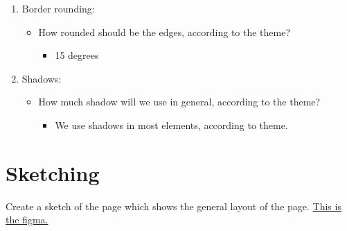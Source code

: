 \documentclass{article}
\begin{document}
\begin{enumerate}
\begin{itemize}
\begin{itemize}
        \end{itemize}
    \end{itemize}
    \item Border rounding:
    \begin{itemize}
        \item How rounded should be the edges, according to the theme?
        \begin{itemize}
            \item 15 degrees
        \end{itemize}
    \end{itemize}
        \item Shadows:
    \begin{itemize}
        \item How much shadow will we use in general, according to the theme?
        \begin{itemize}
            \item We use shadows in most elements, according to theme.
        \end{itemize}
    \end{itemize}
\end{enumerate}

\section{Sketching}
Create a sketch of the page which shows the general layout of the page.
\href{https://www.figma.com/design/Bad0CJ6dLRK9TCG3znJ58A/Rental-Roulette?node-id=448-2&p=f&t=oREOp7yr8ViVVVtf-0}{This is the figma.}
\end{document}
